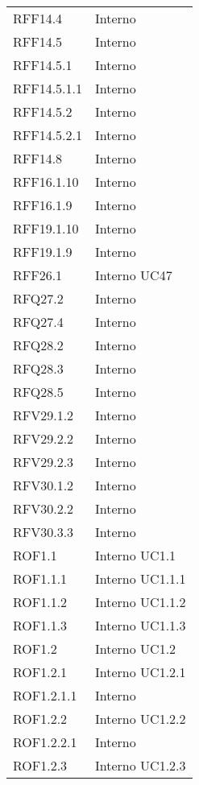 \begin{longtable}{p{2.5cm}!{\VRule[1pt]}p{2.5cm}}
	RFF14.4 & Interno \\
	RFF14.5 & Interno \\
	RFF14.5.1 & Interno \\
	RFF14.5.1.1 & Interno \\
	RFF14.5.2 & Interno \\
	RFF14.5.2.1 & Interno \\
	RFF14.8 & Interno \\
	RFF16.1.10 & Interno \\
	RFF16.1.9 & Interno \\
	RFF19.1.10 & Interno \\
	RFF19.1.9 & Interno \\
	RFF26.1 & Interno \newline UC47
	\\
	RFQ27.2 & Interno \\
	RFQ27.4 & Interno \\
	RFQ28.2 & Interno \\
	RFQ28.3 & Interno \\
	RFQ28.5 & Interno \\
	RFV29.1.2 & Interno \\
	RFV29.2.2 & Interno \\
	RFV29.2.3 & Interno \\
	RFV30.1.2 & Interno \\
	RFV30.2.2 & Interno \\
	RFV30.3.3 & Interno \\
	ROF1.1 & Interno \newline UC1.1
	\\
	ROF1.1.1 & Interno \newline UC1.1.1
	\\
	ROF1.1.2 & Interno \newline UC1.1.2
	\\
	ROF1.1.3 & Interno \newline UC1.1.3
	\\
	ROF1.2 & Interno \newline UC1.2
	\\
	ROF1.2.1 & Interno \newline UC1.2.1
	\\
	ROF1.2.1.1 & Interno \\
	ROF1.2.2 & Interno \newline UC1.2.2
	\\
	ROF1.2.2.1 & Interno \\
	ROF1.2.3 & Interno \newline UC1.2.3
	\\

\end{longtable}
